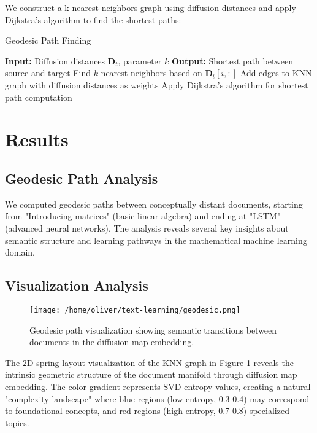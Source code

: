 \documentclass[12pt,a4paper]{article}
\begin{document}
We construct a k-nearest neighbors graph using diffusion distances and apply Dijkstra's algorithm \cite{djikstra} to find the shortest paths:

\begin{algorithm}
\caption{Geodesic Path Finding}
\begin{algorithmic}
\STATE \textbf{Input:} Diffusion distances $\mathbf{D}_t$, parameter $k$
\STATE \textbf{Output:} Shortest path between source and target
    \STATE Find $k$ nearest neighbors based on $\mathbf{D}_t[i,:]$
    \STATE Add edges to KNN graph with diffusion distances as weights
\ENDFOR
\STATE Apply Dijkstra's algorithm for shortest path computation
\end{algorithmic}
\end{algorithm}

\section{Results}

\subsection{Geodesic Path Analysis}

We computed geodesic paths between conceptually distant documents, starting from "Introducing matrices" (basic linear algebra) and ending at "LSTM" (advanced neural networks). The analysis reveals several key insights about semantic structure and learning pathways in the mathematical machine learning domain.

\subsection{Visualization Analysis}

\begin{figure}[H]
\centering
\texttt{[image: /home/oliver/text-learning/geodesic.png]}
\caption{Geodesic path visualization showing semantic transitions between documents in the diffusion map embedding.}
\label{fig:geodesic}
\end{figure}

The 2D spring layout \cite{spring-layout} visualization of the KNN graph in Figure \ref{fig:geodesic} reveals the intrinsic geometric structure of the document manifold through diffusion map embedding. The color gradient represents SVD entropy values, creating a natural "complexity landscape" where blue regions (low entropy, 0.3-0.4) may correspond to foundational concepts, and red regions (high entropy, 0.7-0.8) specialized topics.
\end{document}

